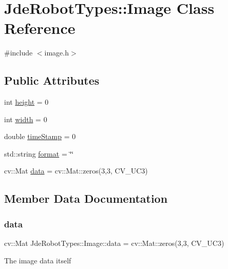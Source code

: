 \hypertarget{class_jde_robot_types_1_1_image}{}\section{Jde\+Robot\+Types\+:\+:Image Class Reference}
\label{class_jde_robot_types_1_1_image}


{\ttfamily \#include $<$image.\+h$>$}

\subsection*{Public Attributes}
\begin{DoxyCompactItemize}
\item 
int \hyperlink{class_jde_robot_types_1_1_image_ad3b073fd5f50c62c535d0083ca0f9ae9}{height} = 0
\item 
int \hyperlink{class_jde_robot_types_1_1_image_ac377507ac13a54f523169f55911e3147}{width} = 0
\item 
double \hyperlink{class_jde_robot_types_1_1_image_a4557271a34c2a35e6a9c03946ed2332c}{time\+Stamp} = 0
\item 
std\+::string \hyperlink{class_jde_robot_types_1_1_image_ac702a6dbc5f6d6009524159bcc4d07e4}{format} = \char`\"{}\char`\"{}
\item 
cv\+::\+Mat \hyperlink{class_jde_robot_types_1_1_image_a00caf819fb206f75e125f9a63f78cb8a}{data} = cv\+::\+Mat\+::zeros(3,3, C\+V\+\_\+U\+C3)
\end{DoxyCompactItemize}


\subsection{Member Data Documentation}
\mbox{\label{class_jde_robot_types_1_1_image_a00caf819fb206f75e125f9a63f78cb8a}} 
\subsubsection{\texorpdfstring{data}{data}}
{\footnotesize\ttfamily cv\+::\+Mat Jde\+Robot\+Types\+::\+Image\+::data = cv\+::\+Mat\+::zeros(3,3, C\+V\+\_\+U\+C3)}

The image data itself \mbox{\label{class_jde_robot_types_1_1_image_ac702a6dbc5f6d6009524159bcc4d07e4}} 
